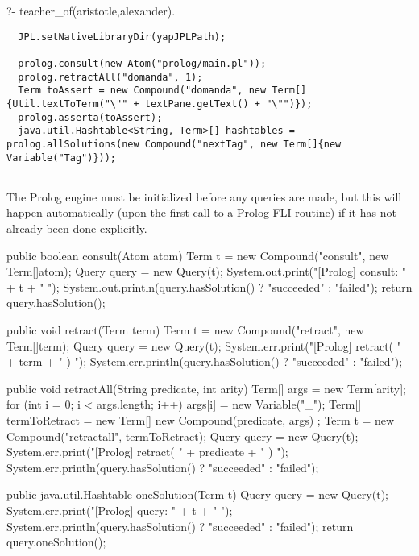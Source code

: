 \begin{prologcode}
  ?- teacher_of(aristotle,alexander).
\end{prologcode}

\begin{Verbatim}
  JPL.setNativeLibraryDir(yapJPLPath);
  
  prolog.consult(new Atom("prolog/main.pl"));
  prolog.retractAll("domanda", 1);
  Term toAssert = new Compound("domanda", new Term[]{Util.textToTerm("\"" + textPane.getText() + "\"")});
  prolog.asserta(toAssert);
  java.util.Hashtable<String, Term>[] hashtables = prolog.allSolutions(new Compound("nextTag", new Term[]{new Variable("Tag")}));
  
\end{Verbatim}
The Prolog engine must be initialized before any queries are made, but this will happen automatically (upon the first call to a Prolog FLI routine) if it has not already been done explicitly.

\begin{javacode}
  public boolean consult(Atom atom) {
    Term t = new Compound("consult", new Term[]{atom});
    Query query = new Query(t);
    System.out.print("[Prolog] consult: " + t + " ");
    System.out.println(query.hasSolution() ? "succeeded" : "failed");
    return query.hasSolution();
  }
\end{javacode}

\begin{javacode}
  public void retract(Term term) {
    Term t = new Compound("retract", new Term[]{term});
    Query query = new Query(t);
    System.err.print("[Prolog] retract( " + term + " ) ");
    System.err.println(query.hasSolution() ? "succeeded" : "failed");
  }
\end{javacode}

\begin{javacode} 
  public void retractAll(String predicate, int arity) {  
    Term[] args = new Term[arity];
    for (int i = 0; i < args.length; i++)
    	args[i] = new Variable("_");
    Term[] termToRetract = new Term[]{ new Compound(predicate, args) };    
    Term t = new Compound("retractall", termToRetract);
    Query query = new Query(t);
    System.err.print("[Prolog] retract( " + predicate + " ) ");
    System.err.println(query.hasSolution() ? "succeeded" : "failed");
  }
\end{javacode}

\begin{javacode}
  public java.util.Hashtable oneSolution(Term t) {
    Query query = new Query(t);
    System.err.print("[Prolog] query: " + t + " ");
    System.err.println(query.hasSolution() ? "succeeded" : "failed");
    return query.oneSolution();
  }
\end{javacode}

